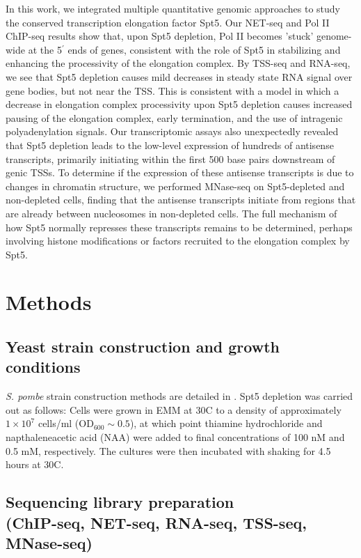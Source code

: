 In this work, we integrated multiple quantitative genomic approaches to study the conserved transcription elongation factor Spt5.
Our NET-seq and Pol II ChIP-seq results show that, upon Spt5 depletion, Pol II becomes 'stuck' genome-wide at the 5$^\prime$ ends of genes, consistent with the role of Spt5 in stabilizing and enhancing the processivity of the elongation complex.
By TSS-seq and RNA-seq, we see that Spt5 depletion causes mild decreases in steady state RNA signal over gene bodies, but not near the TSS.
This is consistent with a model in which a decrease in elongation complex processivity upon Spt5 depletion causes increased pausing of the elongation complex, early termination, and the use of intragenic polyadenylation signals.
Our transcriptomic assays also unexpectedly revealed that Spt5 depletion leads to the low-level expression of hundreds of antisense transcripts, primarily initiating within the first 500 base pairs downstream of genic TSSs.
To determine if the expression of these antisense transcripts is due to changes in chromatin structure, we performed MNase-seq on Spt5-depleted and non-depleted cells, finding that the antisense transcripts initiate from regions that are already between nucleosomes in non-depleted cells.
The full mechanism of how Spt5 normally represses these transcripts remains to be determined, perhaps involving histone modifications or factors recruited to the elongation complex by Spt5.

\section{Methods}

\subsection{Yeast strain construction and growth conditions}

\textit{S. pombe} strain construction methods are detailed in \citet{shetty2017}.
Spt5 depletion was carried out as follows: Cells were grown in EMM at 30\textdegree C to a density of approximately $1 \times 10^7$ cells/ml ($\text{OD}_{600} \sim 0.5$), at which point thiamine hydrochloride and napthaleneacetic acid (NAA) were added to final concentrations of 100 nM and 0.5 mM, respectively.
The cultures were then incubated with shaking for 4.5 hours at 30\textdegree C.

\subsection{Sequencing library preparation\\(ChIP-seq, NET-seq, RNA-seq, TSS-seq, MNase-seq)}

